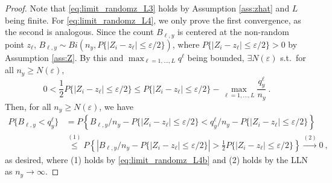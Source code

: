 \documentclass[10pt,a4paper]{amsart}
\begin{document}
\begin{proof}
  Note that \eqref{eq:limit_randomz_L3} holds by Assumption \ref{ass:zhat} and $L$ being finite. For \eqref{eq:limit_randomz_L4}, we only prove the first convergence, as the second is analogous. Since the count $B_{\ell,y}$ is centered at the non-random point $z_\ell$, $B_{\ell,y}\sim Bi(n_y,P\{|Z_{i}-z_{\ell}|\leq\varepsilon/2\})$, where $P\{|Z_{i}-z_{\ell}|\leq\varepsilon/2\}>0$ by Assumption \ref{ass:Z}. By this and $\max_{\ell=1,\ldots,L}q^{\ell}$ being bounded, $\exists N(\varepsilon)$ s.t.\ for all $n_y\geq N(\varepsilon)$,
  \begin{equation}
  0<\frac{1}{2}P\{|Z_{i}-z_{\ell}|\leq\varepsilon/2\}\leq
  P\{|Z_{i}-z_{\ell}|\leq\varepsilon/2\}-\max_{\ell=1,\ldots,L}\frac{q^{\ell}_y}{n_y}~.
  \label{eq:limit_randomz_L4b}
  \end{equation}
  Then, for all $n_y\geq N(\varepsilon)$, we have
  \begin{align*}
  P\{B_{\ell,y}<q_{y}^{\ell}\}
  &=P\left\{{B_{\ell,y}}/{n_y}-P\{|Z_{i}-z_{\ell}|\leq\varepsilon/2\}
  <{q^{\ell}_y}/{n_y}-P\{|Z_{i}-z_{\ell}|\leq\varepsilon/2\}\right\}\\
  &\overset{(1)}{\leq}P\left\{\left\vert{B_{\ell,y}}/{n_y}
  -P\{|Z_{i}-z_{\ell}|\leq\varepsilon/2\}\right\vert
  >\tfrac{1}{2}P\{|Z_{i}-z_{\ell}|\leq\varepsilon/2\}\right\}
  \overset{(2)}{\rightarrow}0~,
  \end{align*}
  as desired, where (1) holds by \eqref{eq:limit_randomz_L4b} and (2) holds by the LLN as $n_y\to\infty$.


\end{proof}
\end{document}
